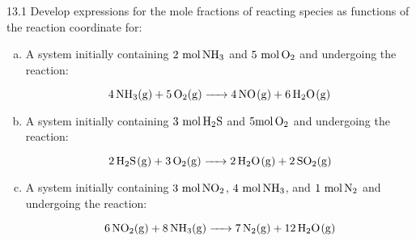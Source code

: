 






\begin{problem}{}{13.1}
  Develop expressions for the mole fractions of reacting species as
  functions of the reaction coordinate for:

  \begin{enumerate}[(a)]
    \item A system initially containing \(2~\unit{\mole} \, \ce{NH3}\)
      and \(5~\unit{\mole} \, \ce{O2}\) and undergoing the reaction:

      \begin{equation*}
        \ce{4NH3(g) + 5O2(g) -> 4NO(g) + 6H2O(g)}
      \end{equation*}

    \item A system initially containing \(3~\unit{\mole} \,
      \ce{H2S}\) and \( 5 \unit{\mole} \, \ce{O2}\) and undergoing the reaction:

      \begin{equation*}
        \ce{2H2S(g) + 3O2(g) -> 2H2O(g) + 2SO2(g)}
      \end{equation*}

    \item A system initially containing \(3~\unit{\mole} \,
      \ce{NO2}\), \(4~\unit{\mole}\,\ce{NH3}\), and
      \(1~\unit{\mole}\,\ce{N2}\) and undergoing the reaction:

      \begin{equation*}
        \ce{6NO2(g) + 8NH3(g) -> 7N2(g) + 12H2O(g)}
      \end{equation*}
  \end{enumerate}
\end{problem}


